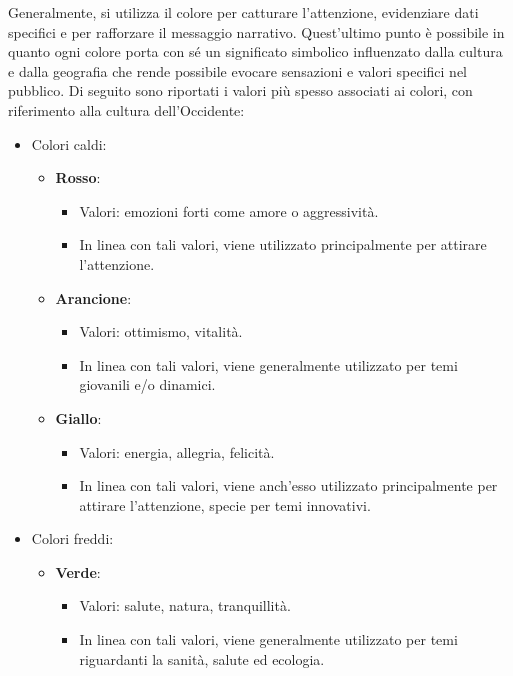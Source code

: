 Generalmente, si utilizza il colore per catturare l'attenzione, evidenziare dati specifici e per rafforzare il messaggio narrativo. Quest'ultimo punto è possibile in quanto ogni colore porta con sé un 
significato simbolico influenzato dalla cultura e dalla geografia che rende possibile evocare sensazioni e valori specifici nel pubblico.
Di seguito sono riportati i valori più spesso associati ai colori, con riferimento alla cultura dell'Occidente:
\begin{itemize}
    \item Colori caldi:
    \begin{itemize}
        \item \textbf{Rosso}:
        \begin{itemize}
            \item Valori: emozioni forti come amore o aggressività.
            \item In linea con tali valori, viene utilizzato principalmente per attirare l'attenzione.
        \end{itemize}
        \item \textbf{Arancione}:
        \begin{itemize}
            \item Valori: ottimismo, vitalità.
            \item In linea con tali valori, viene generalmente utilizzato per temi giovanili e/o dinamici.
        \end{itemize}
        \item \textbf{Giallo}:
        \begin{itemize}
            \item Valori: energia, allegria, felicità.
            \item In linea con tali valori, viene anch'esso utilizzato principalmente per attirare l'attenzione, specie per temi innovativi.
        \end{itemize}
    \end{itemize}
    \item Colori freddi:
    \begin{itemize}
        \item \textbf{Verde}:
        \begin{itemize}
            \item Valori: salute, natura, tranquillità.
            \item In linea con tali valori, viene generalmente utilizzato per temi riguardanti la sanità, salute ed ecologia.
        \end{itemize}

\end{itemize}
\end{itemize}
